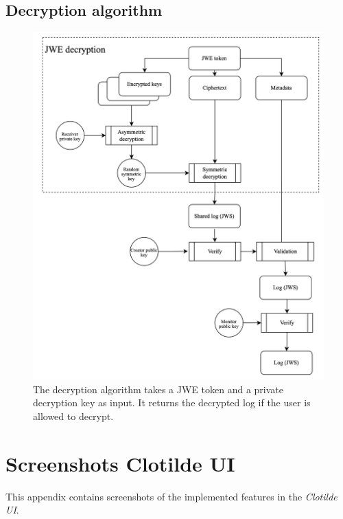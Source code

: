\documentclass[../main.tex]{subfiles}
\begin{document}
\section{Decryption algorithm}
\label{app:decryption}
\begin{figure}[h]
    \includegraphics[scale=0.153]{../img/05/decrypt_logs.png}
    \centering
    \caption[Decryption algorithm]{The decryption algorithm takes a JWE token and a private decryption key as input. It returns the decrypted log if the user is allowed to decrypt.}
    \label{app:decryption_algo}
\end{figure}

\chapter{Screenshots Clotilde UI}

This appendix contains screenshots of the implemented features in the \emph{Clotilde UI}.
\end{document}
